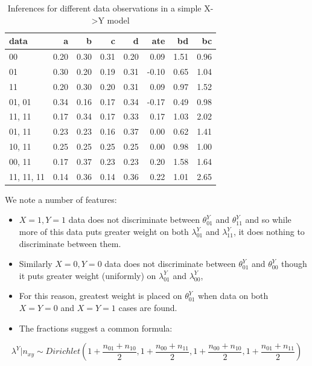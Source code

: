\documentclass[12pt,]{book}
\providecommand{\tightlist}{%
  \setlength{\itemsep}{0pt}\setlength{\parskip}{0pt}}
\begin{document}
\begin{table}[t]

\caption{\label{tab:XYresultstable}Inferences for different data observations in a simple X->Y model}
\centering
\begin{tabular}{l|r|r|r|r|r|r|r}
\hline
data & a & b & c & d & ate & bd & bc\\
\hline
00 & 0.20 & 0.30 & 0.31 & 0.20 & 0.09 & 1.51 & 0.96\\
\hline
01 & 0.30 & 0.20 & 0.19 & 0.31 & -0.10 & 0.65 & 1.04\\
\hline
11 & 0.20 & 0.30 & 0.20 & 0.31 & 0.09 & 0.97 & 1.52\\
\hline
01, 01 & 0.34 & 0.16 & 0.17 & 0.34 & -0.17 & 0.49 & 0.98\\
\hline
11, 11 & 0.17 & 0.34 & 0.17 & 0.33 & 0.17 & 1.03 & 2.02\\
\hline
01, 11 & 0.23 & 0.23 & 0.16 & 0.37 & 0.00 & 0.62 & 1.41\\
\hline
10, 11 & 0.25 & 0.25 & 0.25 & 0.25 & 0.00 & 0.98 & 1.00\\
\hline
00, 11 & 0.17 & 0.37 & 0.23 & 0.23 & 0.20 & 1.58 & 1.64\\
\hline
11, 11, 11 & 0.14 & 0.36 & 0.14 & 0.36 & 0.22 & 1.01 & 2.65\\
\hline
\end{tabular}
\end{table}

We note a number of features:

\begin{itemize}
\tightlist
\item
  \(X=1, Y=1\) data does not discriminate between \(\theta^Y_{01}\) and \(\theta^Y_{11}\) and so while more of this data puts greater weight on both \(\lambda^Y_{01}\) and \(\lambda^Y_{11}\), it does nothing to discriminate between them.
\item
  Similarly \(X=0, Y=0\) data does not discriminate between \(\theta^Y_{01}\) and \(\theta^Y_{00}\) though it puts greater weight (uniformly) on \(\lambda^Y_{01}\) and \(\lambda^Y_{00}\),
\item
  For this reason, greatest weight is placed on \(\theta^Y_{01}\) when data on both \(X=Y=0\) and \(X=Y=1\) cases are found.
\item
  The fractions suggest a common formula:
\end{itemize}

\[\lambda^Y|n_{xy} \sim Dirichlet\left(1+\frac{n_{01} + n_{10}}2, 1+\frac{n_{00} + n_{11}}2, 1+\frac{n_{00} + n_{10}}2, 1+\frac{n_{01} + n_{11}}2\right)\]
\end{document}
